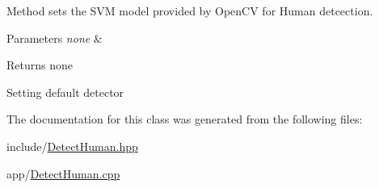 Method sets the S\+VM model provided by Open\+CV for Human detcection. 


\begin{DoxyParams}{Parameters}
{\em none} & \\
\hline
\end{DoxyParams}
\begin{DoxyReturn}{Returns}
none 
\end{DoxyReturn}
Setting default detector 

The documentation for this class was generated from the following files\+:\begin{DoxyCompactItemize}
\item 
include/\hyperlink{DetectHuman_8hpp}{Detect\+Human.\+hpp}\item 
app/\hyperlink{DetectHuman_8cpp}{Detect\+Human.\+cpp}\end{DoxyCompactItemize}
